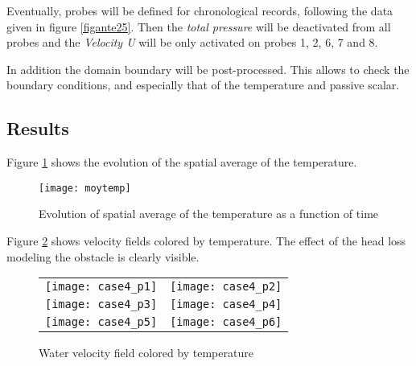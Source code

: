 Eventually, probes will be defined for chronological records, following the data
given in figure \ref{figante25}. Then the {\itshape total pressure} will be
deactivated from all probes and the {\itshape Velocity U} will be only activated
on probes  1, 2, 6, 7 and 8.


In addition the domain boundary will be post-processed. This allows to check the
boundary conditions, and especially that of the temperature and passive scalar.



        \subsection{Results}
Figure \ref{fige2_e4} shows the evolution of the spatial average of the temperature.

\begin{figure}[h]
\begin{center}
\texttt{[image: moytemp]}
\caption{Evolution of spatial average of the temperature as a function of time}
\label{fige2_e4}
\end{center}
\end{figure}

Figure \ref{fige1_e4} shows velocity fields colored by temperature. The effect
of the head loss modeling the obstacle is clearly visible.

\begin{figure}
\begin{center}
\begin{tabular}{cc}
\texttt{[image: case4\_p1]} &
\texttt{[image: case4\_p2]} \\
\texttt{[image: case4\_p3]} &
\texttt{[image: case4\_p4]} \\
\texttt{[image: case4\_p5]} &
\texttt{[image: case4\_p6]} \\
\end{tabular}
\caption{Water velocity field colored by temperature}
\label{fige1_e4}
\end{center}
\end{figure}


